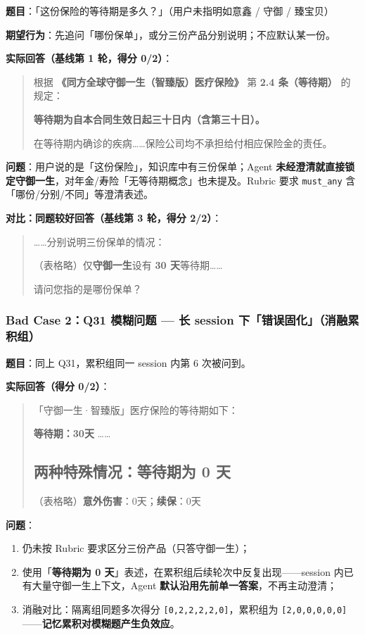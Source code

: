 \documentclass[11pt,a4paper]{ctexart}
\begin{document}
\textbf{题目}：「这份保险的等待期是多久？」（用户未指明如意鑫 / 守御 / 臻宝贝）

\textbf{期望行为}：先追问「哪份保单」，或分三份产品分别说明；不应默认某一份。

\textbf{实际回答（基线第 1 轮，得分 0/2）}：

\begin{quote}
根据 \textbf{《同方全球守御一生（智臻版）医疗保险》} 第 \textbf{2.4 条（等待期）} 的规定：

\textbf{等待期为自本合同生效日起三十日内（含第三十日）。}

在等待期内确诊的疾病……保险公司均不承担给付相应保险金的责任。
\end{quote}

\textbf{问题}：用户说的是「这份保险」，知识库中有三份保单；Agent \textbf{未经澄清就直接锁定守御一生}，对年金/寿险「无等待期概念」也未提及。Rubric 要求 \texttt{must\_any} 含「哪份/分别/不同」等澄清表述。

\textbf{对比：同题较好回答（基线第 3 轮，得分 2/2）}：

\begin{quote}
……分别说明三份保单的情况：

（表格略）仅\textbf{守御一生}设有 \textbf{30 天}等待期……

请问您指的是哪份保单？
\end{quote}

\subsubsection{Bad Case 2：Q31 模糊问题 — 长 session 下「错误固化」（消融累积组）}

\textbf{题目}：同上 Q31，累积组同一 session 内第 6 次被问到。

\textbf{实际回答（得分 0/2）}：

\begin{quote}
「守御一生·智臻版」医疗保险的等待期如下：

\textbf{等待期：30天} ……

\subsection*{两种特殊情况：等待期为 0 天}

（表格略）\textbf{意外伤害}：0天；\textbf{续保}：0天
\end{quote}

\textbf{问题}：

\begin{enumerate}[nosep]
  \item 仍未按 Rubric 要求区分三份产品（只答守御一生）；
  \item 使用「\textbf{等待期为 0 天}」表述，在累积组后续轮次中反复出现——session 内已有大量守御一生上下文，Agent \textbf{默认沿用先前单一答案}，不再主动澄清；
  \item 消融对比：隔离组同题多次得分 \texttt{[0,2,2,2,2,0]}，累积组为 \texttt{[2,0,0,0,0,0]}——\textbf{记忆累积对模糊题产生负效应}。
\end{enumerate}
\end{document}
